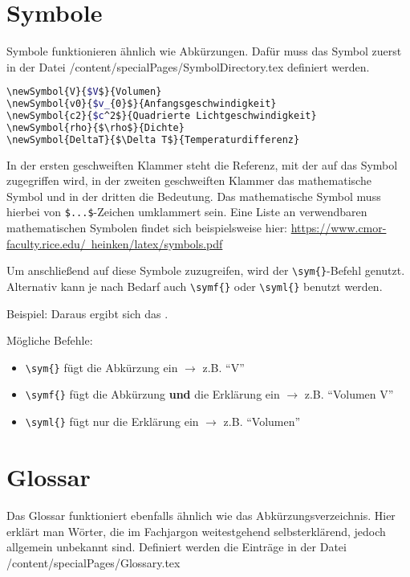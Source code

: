 \section{Symbole}
Symbole funktionieren ähnlich wie Abkürzungen. Dafür muss das Symbol zuerst in der Datei /content/specialPages/SymbolDirectory.tex definiert werden.

\begin{lstlisting}[caption=Beispiel einer Symbol-Definition, label=lst:symbol_def, language=bash]
\newSymbol{V}{$V$}{Volumen}
\newSymbol{v0}{$v_{0}$}{Anfangsgeschwindigkeit}
\newSymbol{c2}{$c^2$}{Quadrierte Lichtgeschwindigkeit}
\newSymbol{rho}{$\rho$}{Dichte}
\newSymbol{DeltaT}{$\Delta T$}{Temperaturdifferenz}
\end{lstlisting}

In der ersten geschweiften Klammer steht die Referenz, mit der auf das Symbol zugegriffen wird, in der zweiten geschweiften Klammer das mathematische Symbol und in der dritten die Bedeutung. Das mathematische Symbol muss hierbei von \texttt{\$...\$}-Zeichen umklammert sein. Eine Liste an verwendbaren mathematischen Symbolen findet sich beispielsweise hier: \href{https://www.cmor-faculty.rice.edu/~heinken/latex/symbols.pdf}{https://www.cmor-faculty.rice.edu/~heinken/latex/symbols.pdf}

Um anschließend auf diese Symbole zuzugreifen, wird der \texttt{\textbackslash{}sym\{\}}-Befehl genutzt. Alternativ kann je nach Bedarf auch \texttt{\textbackslash{}symf\{\}} oder \texttt{\textbackslash{}syml\{\}} benutzt werden.

Beispiel: Daraus ergibt sich das .

Mögliche Befehle:
\begin{itemize}
    \item \texttt{\textbackslash{}sym\{\}} fügt die Abkürzung ein $\rightarrow$ z.B. \enquote{V}
    \item \texttt{\textbackslash{}symf\{\}} fügt die Abkürzung \textbf{und} die Erklärung ein $\rightarrow$ z.B. \enquote{Volumen V}
    \item \texttt{\textbackslash{}syml\{\}} fügt nur die Erklärung ein $\rightarrow$ z.B. \enquote{Volumen}
\end{itemize}


\section{Glossar}
Das Glossar funktioniert ebenfalls ähnlich wie das Abkürzungsverzeichnis. Hier erklärt man Wörter, die im Fachjargon weitestgehend selbsterklärend, jedoch allgemein unbekannt sind. Definiert werden die Einträge in der Datei /content/specialPages/Glossary.tex

